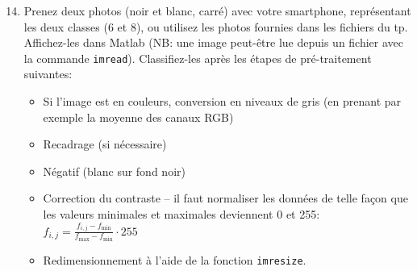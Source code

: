 	\begin{enumerate}
	\setcounter{enumi}{13}
		\item Prenez deux photos (noir et blanc, carré) avec votre smartphone, représentant les deux classes (6 et 8), ou utilisez les photos fournies dans les fichiers du tp. Affichez-les dans Matlab (NB: une image peut-être lue depuis un fichier avec la commande \texttt{imread}). Classifiez-les après les étapes de pré-traitement suivantes:
	\begin{itemize}[label=-]
		\item Si l'image est en couleurs, conversion en niveaux de gris (en prenant par exemple la moyenne des canaux RGB)
		\item Recadrage (si nécessaire)
		\item Négatif (blanc sur fond noir)
		\item Correction du contraste -- il faut normaliser les données de telle façon que les valeurs minimales et maximales deviennent 0 et 255: $f_{i,j} = \frac{f_{i,j}-f_{\min}}{f_{\max}-f_{\min}}\cdot 255$
		\item Redimensionnement à l'aide de la fonction \texttt{imresize}.
	\end{itemize}
\end{enumerate}